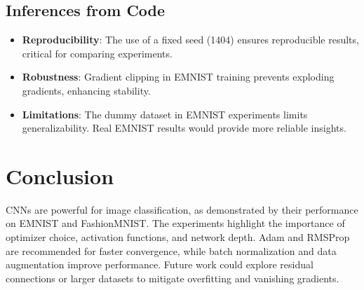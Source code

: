\documentclass{article}
\begin{document}
\subsection{Inferences from Code}
\begin{itemize}
    \item \textbf{Reproducibility}: The use of a fixed seed (1404) ensures reproducible results, critical for comparing experiments.
    \item \textbf{Robustness}: Gradient clipping in EMNIST training prevents exploding gradients, enhancing stability.
    \item \textbf{Limitations}: The dummy dataset in EMNIST experiments limits generalizability. Real EMNIST results would provide more reliable insights.
\end{itemize}

\section{Conclusion}
CNNs are powerful for image classification, as demonstrated by their performance on EMNIST and FashionMNIST. The experiments highlight the importance of optimizer choice, activation functions, and network depth. Adam and RMSProp are recommended for faster convergence, while batch normalization and data augmentation improve performance. Future work could explore residual connections or larger datasets to mitigate overfitting and vanishing gradients.
\end{document}
